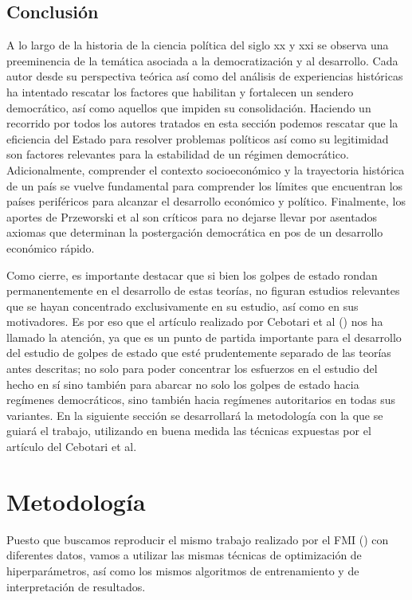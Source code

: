 \documentclass{article}
\begin{document}
\subsection{Conclusión}
A lo largo de la historia de la ciencia política del siglo xx y xxi se observa una
preeminencia de la temática asociada a la democratización y al desarrollo. Cada autor
desde su perspectiva teórica así como del análisis de experiencias históricas ha intentado
rescatar los factores que habilitan y fortalecen un sendero democrático, así como aquellos
que impiden su consolidación. Haciendo un recorrido por todos los autores tratados en esta
sección podemos rescatar que la eficiencia del Estado para resolver problemas políticos así
como su legitimidad son factores relevantes para la estabilidad de un régimen democrático.
Adicionalmente, comprender el contexto socioeconómico y la trayectoria histórica de un país
se vuelve fundamental para comprender los límites que encuentran los países periféricos para
alcanzar el desarrollo económico y político. Finalmente, los aportes de Przeworski et al
son críticos para no dejarse llevar por asentados axiomas que determinan la postergación
democrática en pos de un desarrollo económico rápido.

Como cierre, es importante destacar que si bien los golpes de estado rondan permanentemente
en el desarrollo de estas teorías, no figuran estudios relevantes que se hayan concentrado
exclusivamente en su estudio, así como en sus motivadores. Es por eso que el artículo
realizado por Cebotari et al (\citeyear{Ceb24}) nos ha llamado la atención, ya que es un
punto de partida importante para el desarrollo del estudio de golpes de estado que esté
prudentemente separado de las teorías antes descritas; no solo para poder concentrar los
esfuerzos en el estudio del hecho en sí sino también para abarcar no solo los golpes de
estado hacia regímenes democráticos, sino también hacia regímenes autoritarios en todas
sus variantes. En la siguiente sección se desarrollará la metodología con la que se guiará
el trabajo, utilizando en buena medida las técnicas expuestas por el artículo del Cebotari
et al.

\section{Metodología}
Puesto que buscamos reproducir el mismo trabajo realizado por el FMI (\cite{Ceb24}) 
con diferentes datos, vamos a utilizar las mismas 
técnicas de optimización de hiperparámetros, así como los mismos algoritmos
de entrenamiento y de interpretación de resultados.
\end{document}
